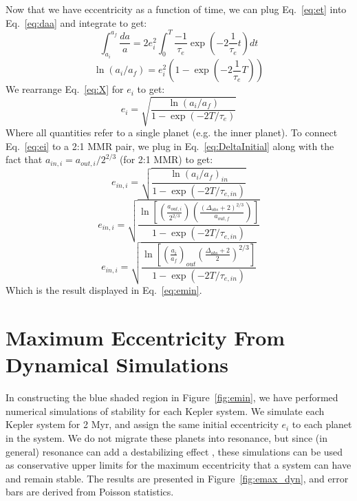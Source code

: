 Now that we have eccentricity as a function of time, we can plug Eq.~\ref{eq:et} into Eq.~\ref{eq:daa} and integrate to get:
\begin{equation*}
\int_{a_i}^{a_f} \frac{da}{a} = 2e_i^2 \int_{0}^{T} \frac{-1}{\tau_e} \exp\left(-2\frac{1}{\tau_e} t \right) dt
\end{equation*}
\begin{equation}
\ln(a_i/a_f) = e_i^2 \left(1 - \exp(-2\frac{1}{\tau_e}T) \right)
\label{eq:X}
\end{equation}
We rearrange Eq.~\ref{eq:X} for $e_i$ to get:
\begin{equation}
e_i = \sqrt{\frac{\ln(a_i/a_f)}{1 - \exp(-2T/\tau_e)}}
\label{eq:ei}
\end{equation}
Where all quantities refer to a single planet (e.g. the inner planet). 
To connect Eq.~\ref{eq:ei} to a 2:1 MMR pair, we plug in Eq.~\ref{eq:DeltaInitial} along with the fact that $a_{in,i} = a_{out,i}/2^{2/3}$ (for 2:1 MMR) to get:
\begin{equation*}
e_{in,i} = \sqrt{\frac{\ln(a_i/a_f)_{in}}{1 - \exp(-2T/\tau_{e,in})}}
\end{equation*}
\begin{equation*}
e_{in,i} = \sqrt{\frac{\ln[(\frac{a_{out,i}}{2^{2/3}}) (\frac{(\Delta_{obs} + 2)^{2/3}}{a_{out,f}}) ]}{1 - \exp(-2T/\tau_{e,in})}}
\end{equation*}
\begin{equation}
e_{in,i} = \sqrt{\frac{\ln[(\frac{a_i}{a_f})_{out} (\frac{\Delta_{obs} + 2}{2})^{2/3}]}{1 - \exp(-2T/\tau_{e,in})}}
\end{equation}
Which is the result displayed in Eq.~\ref{eq:emin}.

\section{Maximum Eccentricity From Dynamical Simulations}
\label{app:emax}
In constructing the blue shaded region in Figure~\ref{fig:emin}, we have performed numerical simulations of stability for each Kepler system.
We simulate each Kepler system for 2 Myr, and assign the same initial eccentricity $e_i$ to each planet in the system. 
We do not migrate these planets into resonance, but since (in general) resonance can add a destabilizing effect \citep{Chambers, Funk2010, Pu2015}, these simulations can be used as conservative upper limits for the maximum eccentricity that a system can have and remain stable.  
The results are presented in Figure~\ref{fig:emax_dyn}, and error bars are derived from Poisson statistics. 

